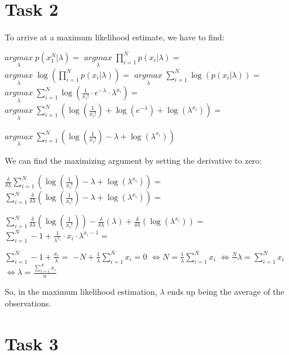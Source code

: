 \documentclass[%
   11pt,              %
   ngerman,           %
   a4paper,           %
   DIV11,             %
]{scrartcl}%
\begin{document}
\section*{Task 2}

To arrive at a maximum likelihood estimate, we have to find:

$\underset{\lambda}{arg max}\; p(x_1^N|\lambda) = $
$\underset{\lambda}{arg max}\;  \displaystyle\prod_{i= 1}^N p(x_i|\lambda) = $
$\underset{\lambda}{arg max}\;  \log(\displaystyle\prod_{i= 1}^N p(x_i|\lambda)) = $
$\underset{\lambda}{arg max}\;  \displaystyle\sum_{i= 1}^N \log(p(x_i|\lambda)) = $
$\underset{\lambda}{arg max}\;  \displaystyle\sum_{i= 1}^N \log(\frac{1}{x_i!}\cdot e^{-\lambda}\cdot \lambda^{x_i} ) = $
$\underset{\lambda}{arg max}\;  \displaystyle\sum_{i= 1}^N (\log(\frac{1}{x_i!}) + \log(e^{-\lambda}) + \log(\lambda^{x_i} )) = $

$\underset{\lambda}{arg max}\;  \displaystyle\sum_{i= 1}^N (\log(\frac{1}{x_i!}) - \lambda + \log(\lambda^{x_i} ))$

We can find the maximizing argument by setting the derivative to zero:

$\frac{\delta}{\delta\lambda} \displaystyle\sum_{i= 1}^N (\log(\frac{1}{x_i!}) - \lambda + \log(\lambda^{x_i} )) = $
$\displaystyle\sum_{i= 1}^N \frac{\delta}{\delta\lambda} (\log(\frac{1}{x_i!}) - \lambda + \log(\lambda^{x_i} )) = $

$\displaystyle\sum_{i= 1}^N \frac{\delta}{\delta\lambda} (\log(\frac{1}{x_i!})) - \frac{\delta}{\delta\lambda}(\lambda) + \frac{\delta}{\delta\lambda}(\log(\lambda^{x_i})) = $
$\displaystyle\sum_{i= 1}^N - 1 + \frac{1}{\lambda^{x_i}} \cdot x_i \cdot \lambda^{x_i-1} = $

$\displaystyle\sum_{i= 1}^N - 1 + \frac{x_i}{\lambda} = $
$-N + \frac{1}{\lambda} \displaystyle\sum_{i= 1}^N   x_i= 0$
$\iff N =\frac{1}{\lambda}\displaystyle\sum_{i= 1}^N  x_i$
$\iff \frac{N}\cdot \lambda =\displaystyle\sum_{i= 1}^N  x_i$
$\iff \lambda =\frac{\sum_{i= 1}^N  x_i}{n}$

So, in the maximum likelihood estimation, $\lambda$ ends up being the average of the observations.
\section*{Task 3}
\end{document}
